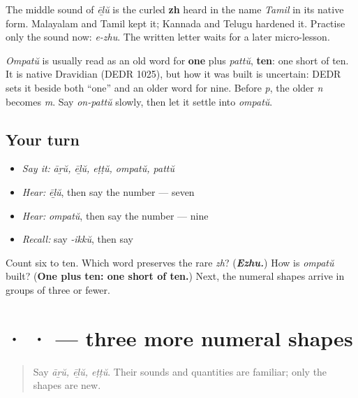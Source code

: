 \begin{culture}
The middle sound of \emph{ēḻŭ} is the curled \textbf{zh} heard in the name \emph{Tamil} in its native form. Malayalam and Tamil kept it; Kannada and Telugu hardened it. Practise only the sound now: \emph{e-zhu}. The written letter waits for a later micro-lesson.
\end{culture}

\begin{cousinweb}
\emph{Ompatŭ} is usually read as an old word for \textbf{one} plus \emph{pattŭ}, \textbf{ten}: one short of ten. It is native Dravidian (DEDR 1025), but how it was built is uncertain: DEDR sets it beside both \textquotedblleft{}one\textquotedblright{} and an older word for nine. Before \emph{p}, the older \emph{n} becomes \emph{m}. Say \emph{on-pattŭ} slowly, then let it settle into \emph{ompatŭ}.
\end{cousinweb}

\subsection*{Your turn}
\begin{itemize}
\raggedright
  \item \emph{Say it:} \emph{āṟŭ, ēḻŭ, eṭṭŭ, ompatŭ, pattŭ}
  \item \emph{Hear:} \emph{ēḻŭ}, then say the number — seven
  \item \emph{Hear:} \emph{ompatŭ}, then say the number — nine
  \item \emph{Recall:} say \emph{-ikkŭ}, then say \textbf{}
\end{itemize}

\begin{tcolorbox}[breakable,colback=teal!4,colframe=teal!35!black,title={Before you move on}]
Count six to ten. Which word preserves the rare \emph{zh}? (\emph{\textbf{Ezhu.}}) How is \emph{ompatŭ} built? (\textbf{One plus ten: one short of ten.}) Next, the numeral shapes arrive in groups of three or fewer.
\end{tcolorbox}
\section[\texorpdfstring{\ml{൬} \ml{൭} \ml{൮} (six, seven, eight)}{൬ ൭ ൮ (six, seven, eight)}]{ ·  ·  — three more numeral shapes}

\label{lesson:ML-W07-digits-6-8}



\begin{quote}
Say \emph{āṟŭ, ēḻŭ, eṭṭŭ}. Their sounds and quantities are familiar; only the shapes are new.
\end{quote}

